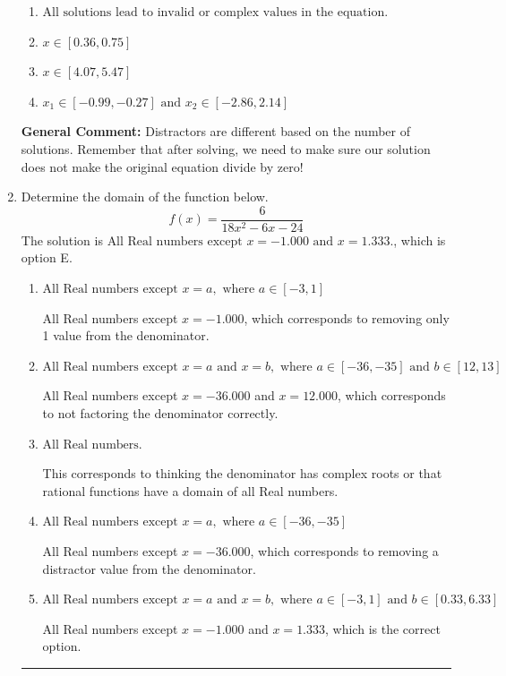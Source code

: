 \documentclass{extbook}[14pt]
\newcommand{\litem}[1]{\item #1

\rule{\textwidth}{0.4pt}}
\begin{document}
\begin{enumerate}
{\begin{enumerate}[label=\Alph*.]
* $x = -0.634 \text{ and } x = 4.734$, which is the correct option.
\item \( \text{All solutions lead to invalid or complex values in the equation.} \)


\item \( x \in [0.36,0.75] \)


\item \( x \in [4.07,5.47] \)


\item \( x_1 \in [-0.99, -0.27] \text{ and } x_2 \in [-2.86,2.14] \)


\end{enumerate}

\textbf{General Comment:} Distractors are different based on the number of solutions. Remember that after solving, we need to make sure our solution does not make the original equation divide by zero!
}
\litem{
Determine the domain of the function below.
\[ f(x) = \frac{6}{18x^{2} -6 x -24} \]The solution is \( \text{All Real numbers except } x = -1.000 \text{ and } x = 1.333. \), which is option E.\begin{enumerate}[label=\Alph*.]
\item \( \text{All Real numbers except } x = a, \text{ where } a \in [-3, 1] \)

All Real numbers except $x = -1.000$, which corresponds to removing only 1 value from the denominator.
\item \( \text{All Real numbers except } x = a \text{ and } x = b, \text{ where } a \in [-36, -35] \text{ and } b \in [12, 13] \)

All Real numbers except $x = -36.000$ and $x = 12.000$, which corresponds to not factoring the denominator correctly.
\item \( \text{All Real numbers.} \)

This corresponds to thinking the denominator has complex roots or that rational functions have a domain of all Real numbers.
\item \( \text{All Real numbers except } x = a, \text{ where } a \in [-36, -35] \)

All Real numbers except $x = -36.000$, which corresponds to removing a distractor value from the denominator.
\item \( \text{All Real numbers except } x = a \text{ and } x = b, \text{ where } a \in [-3, 1] \text{ and } b \in [0.33, 6.33] \)

All Real numbers except $x = -1.000$ and $x = 1.333$, which is the correct option.
\end{enumerate}

}
\end{enumerate}
\end{document}
